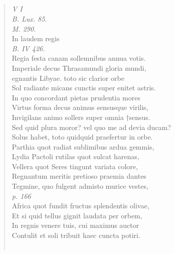 \documentclass[11pt, a4paper]{report}
\begin{document}
            \subsection*{}
      \begin{verse}
      \textit{V I} \\ \textit{B. Lux. 85.} \\ \textit{M. 290.} \\ In laudem regis \\ \textit{B. IV 426.} \\ Regia festa canam sollemnibus annua votis. \\ Imperiale decus Thrasamundi gloria mundi, \\ egnantis Libyae. toto sic clarior orbe \\ Sol radiante micans cunctis super enitet astris. \\ In quo concordant pietas prudentia mores \\ Virtus forma decus animus sensusque virilis, \\ Invigilans animo sollers super omnia †sensus. \\ Sed quid plura moror? vel quo me ad devia ducam? \\ Solus habet, toto quidquid praefertur in orbe. \\ Parthia quot radiat sublimibus ardua gemmis, \\ Lydia Pactoli rutilas quot sulcat harenas, \\ Vellera quot Seres tingunt variata colore, \\ Regnantum meritis pretioso praemia dantes \\ Tegmine, quo fulgent admisto murice vestes, \\ \textit{p. 166} \\ Africa quot fundit fructus splendentis olivae, \\ Et si quid tellus gignit laudata per orbem, \\ In regnis venere tuis, cui maximus auctor \\ Contulit et soli tribuit haec cuncta potiri. \\ 
        ﻿\pagebreak 

\end{verse}
\end{document}
